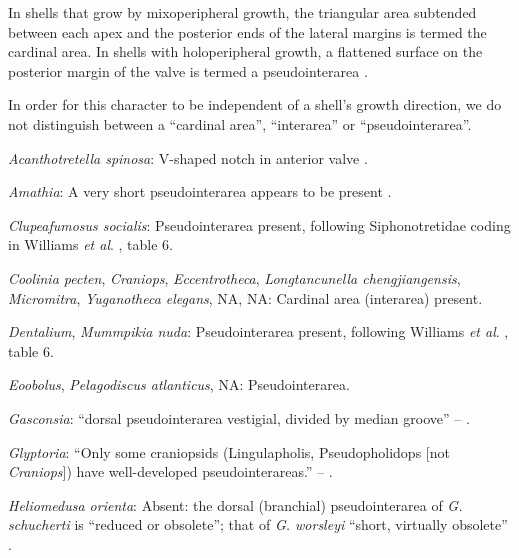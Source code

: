 \documentclass[openany]{book}
\theoremstyle{definition}
\theoremstyle{definition}
\theoremstyle{definition}
\theoremstyle{remark}
\begin{document}
In shells that grow by mixoperipheral growth, the triangular area
subtended between each apex and the posterior ends of the lateral
margins is termed the cardinal area. In shells with holoperipheral
growth, a flattened surface on the posterior margin of the valve is
termed a pseudointerarea
\citep[paraphrasing][]{Williams1997Introduction}.

In order for this character to be independent of a shell's growth
direction, we do not distinguish between a ``cardinal area'',
``interarea'' or ``pseudointerarea''.

\hypertarget{Acanthotretella_spinosa-coding-85}{}
\emph{Acanthotretella spinosa}: V-shaped notch in anterior valve
\citep{Schwabe2010}.

\hypertarget{Amathia-coding-85}{}
\emph{Amathia}: A very short pseudointerarea appears to be present
\citep{Moysiuk2017Hyolithsare}.

\hypertarget{Clupeafumosus_socialis-coding-85}{}
\emph{Clupeafumosus socialis}: Pseudointerarea present, following
Siphonotretidae coding in Williams \emph{et al}.
\citeyearpar{Williams2000LinguliformeaCraniiformea}, table 6.

\hypertarget{Coolinia_pecten-coding-85}{}
\emph{Coolinia pecten}, \emph{Craniops}, \emph{Eccentrotheca},
\emph{Longtancunella chengjiangensis}, \emph{Micromitra},
\emph{Yuganotheca elegans}, NA, NA: Cardinal area (interarea) present.

\hypertarget{Dentalium-coding-85}{}
\emph{Dentalium}, \emph{Mummpikia nuda}: Pseudointerarea present,
following Williams \emph{et al}.
\citeyearpar{Williams2000LinguliformeaCraniiformea}, table 6.

\hypertarget{Eoobolus-coding-85}{}
\emph{Eoobolus}, \emph{Pelagodiscus atlanticus}, NA: Pseudointerarea.

\hypertarget{Gasconsia-coding-85}{}
\emph{Gasconsia}: ``dorsal pseudointerarea vestigial, divided by median
groove'' -- \citet{Williams2000LinguliformeaCraniiformea}.

\hypertarget{Glyptoria-coding-85}{}
\emph{Glyptoria}: ``Only some craniopsids (Lingulapholis,
Pseudopholidops {[}not \emph{Craniops}{]}) have well-developed
pseudointerareas.'' -- \citet{Williams2000LinguliformeaCraniiformea}.

\hypertarget{Heliomedusa_orienta-coding-85}{}
\emph{Heliomedusa orienta}: Absent: the dorsal (branchial)
pseudointerarea of \emph{G. schucherti} is ``reduced or obsolete''; that
of \emph{G. worsleyi} ``short, virtually obsolete''
\citep{Hanken1985Thetaxonomy}.
\end{document}
